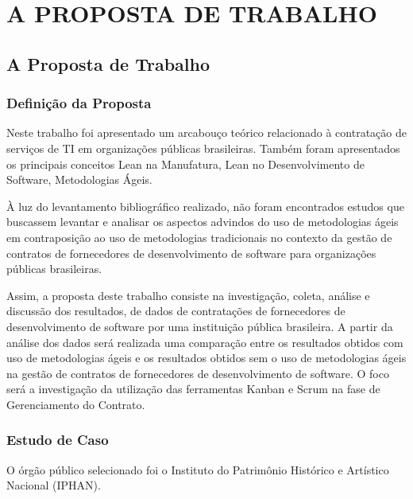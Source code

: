 \part{A PROPOSTA DE TRABALHO}

\chapter[A Proposta de Trabalho]{A Proposta de Trabalho}

\section[Definição da Proposta]{Definição da Proposta}

Neste trabalho foi apresentado um arcabouço teórico relacionado à contratação de serviços de TI em organizações públicas brasileiras. Também foram apresentados os principais conceitos Lean na Manufatura, Lean no Desenvolvimento de Software, Metodologias Ágeis.

À luz do levantamento bibliográfico realizado, não foram encontrados estudos que buscassem levantar e analisar os aspectos advindos do uso de metodologias ágeis em contraposição ao uso de metodologias tradicionais no contexto da gestão de contratos de fornecedores de desenvolvimento de software para organizações públicas brasileiras.

Assim, a proposta deste trabalho consiste na investigação, coleta, análise e discussão dos resultados, de dados de contratações de fornecedores de desenvolvimento de software por uma instituição pública brasileira. A partir da análise  dos dados será realizada uma comparação entre os resultados obtidos com uso de metodologias ágeis e os resultados obtidos sem o uso de metodologias ágeis na gestão de contratos de fornecedores de desenvolvimento de software. O foco será a investigação da utilização das ferramentas Kanban e Scrum na fase de Gerenciamento do Contrato.


\section[Estudo de Caso]{Estudo de Caso}

O órgão público selecionado foi o Instituto do Patrimônio Histórico e Artístico Nacional (IPHAN).

